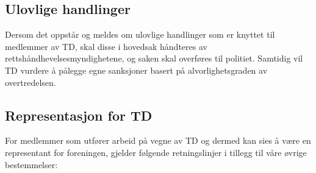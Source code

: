 \documentclass[11pt]{article}
\begin{document}
\subsection{Ulovlige handlinger}
Dersom det oppstår og meldes om ulovlige handlinger som er knyttet til medlemmer av TD, skal disse i hovedsak håndteres av rettshåndhevelsesmyndighetene, og saken skal overføres til politiet. Samtidig vil TD vurdere å pålegge egne sanksjoner basert på alvorlighetsgraden av overtredelsen.
 
\subsection{Representasjon for TD}
For medlemmer som utfører arbeid på vegne av TD og dermed kan sies å være en representant for foreningen, gjelder følgende retningslinjer i tillegg til våre øvrige bestemmelser:
\end{document}
